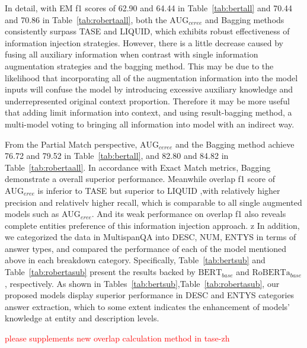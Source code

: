 \documentclass[mathematics,article,submit,moreauthors]{Definitions/mdpi}
\newcommand{\1}[1]{\mathds{1}\left[#1\right]}
\begin{document}
	In detail, with EM f1 scores of 62.90 and 64.44 in Table~\ref{tab:bertall} and 70.44 and 70.86 in Table~\ref{tab:robertaall}, both the $\text{AUG}_{ceree}$ and Bagging methods consistently surpass TASE and LIQUID, which exhibits robust effectiveness of information injection strategies. However, there is a little decrease caused by fusing all auxiliary information when contrast with single information augmentation strategies and the bagging method. This may be due to the likelihood that incorporating all of the augmentation information into the model inputs will confuse the model by introducing excessive auxiliary knowledge and underrepresented original context proportion. Therefore it may be more useful that adding limit information into context, and using result-bagging method, a multi-model voting to bringing all information into model with an indirect way.
	
	From the Partial Match perspective, $\text{AUG}_{ceree}$ and the Bagging method achieve 76.72 and 79.52 in Table~\ref{tab:bertall}, and 82.80 and 84.82 in Table~\ref{tab:robertaall}. In accordance with Exact Match metrics, Bagging demonstrate a overall superior performance. Meanwhile overlap f1 score of $\text{AUG}_{eree}$ is inferior to TASE but superior to LIQUID ,with relatively higher precision and relativelv higher recall, which  is comparable to all single augmented models such as $\text{AUG}_{eree}$. And its weak performance on overlap f1 also reveals complete entities preference of this information injection approach.
	z
	In addition, we	categorized the data in MultispanQA into DESC, NUM, ENTYS in terms of answer types, and compared the performance of each of the model mentioned above in each breakdown category. Specifically,  Table~\ref{tab:bertsub} and Table~\ref{tab:robertasub} present the results backed by  $\text{BERT}_{base}$ and $\text{RoBERTa}_{base}$, respectively. As shown in Tables~\ref{tab:bertsub},Table~\ref{tab:robertasub}, our proposed models display superior performance in DESC and ENTYS categories answer extraction, which to some extent indicates the enhancement of models' knowledge at entity and description levels.
	
	\textcolor{red}{please supplements new overlap calculation method in tase-zh}
	
\end{document}
